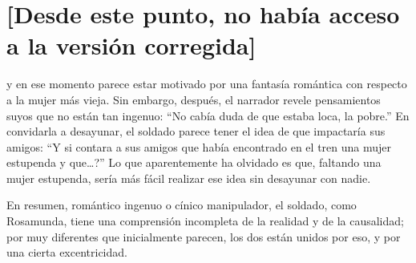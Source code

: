 \documentclass[11pt]{article}
\begin{document}
\section*{[Desde este punto, no había acceso a la versión corregida]}
\label{sec-1}



y en ese momento parece estar motivado por una fantasía romántica con
respecto a la mujer más vieja. Sin embargo, después, el narrador
revele pensamientos suyos que no están tan ingenuo: ``No cabía duda de
que estaba loca, la pobre.'' En convidarla a desayunar, el soldado
parece tener el idea de que impactaría sus amigos: ``Y si contara a sus
amigos que había encontrado en el tren una mujer estupenda y que\ldots{}?''
Lo que aparentemente ha olvidado es que, faltando una mujer estupenda,
sería más fácil realizar ese idea sin desayunar con nadie.

En resumen, romántico ingenuo o cínico manipulador, el soldado, como
Rosamunda, tiene una comprensión incompleta de la realidad y de la
causalidad; por muy diferentes que inicialmente parecen, los dos están
unidos por eso, y por una cierta excentricidad.
\end{document}
